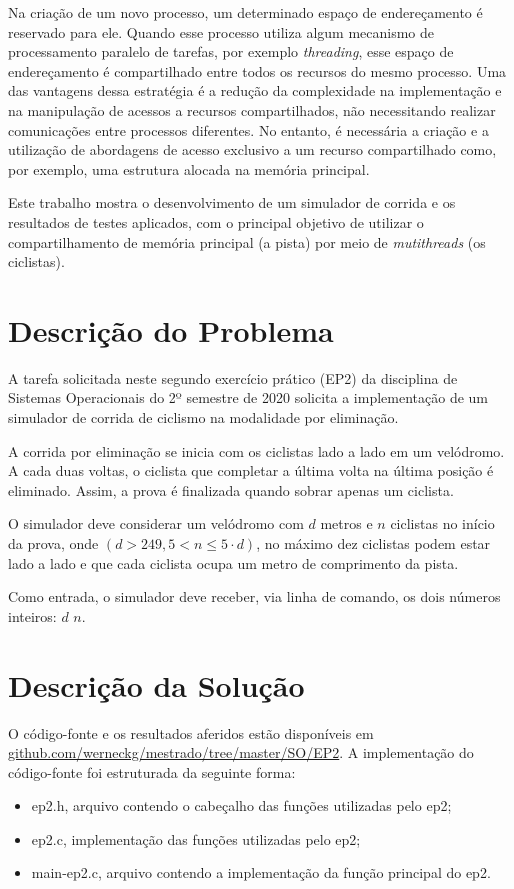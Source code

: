 \documentclass[12pt]{article}
\begin{document}
Na criação de um novo processo, um determinado espaço de endereçamento é reservado para ele. Quando esse processo utiliza algum mecanismo de processamento paralelo de tarefas, por exemplo \textit{threading}, esse espaço de endereçamento é compartilhado entre todos os recursos do mesmo processo. Uma das vantagens dessa estratégia é a redução da complexidade na implementação e na manipulação de acessos a recursos compartilhados, não necessitando realizar comunicações entre processos diferentes. No entanto, é necessária a criação e a utilização de abordagens de acesso exclusivo a um recurso compartilhado como, por exemplo, uma estrutura alocada na memória principal.

Este trabalho mostra o desenvolvimento de um simulador de corrida e os resultados de testes aplicados, com o principal objetivo de utilizar o compartilhamento de memória principal (a pista) por meio de \textit{mutithreads} (os ciclistas).

\section{Descrição do Problema} \label{sec:firstpage}

A tarefa solicitada neste segundo exercício prático (EP2) da disciplina de Sistemas Operacionais do 2º semestre de 2020 solicita a implementação de um simulador de corrida de ciclismo na modalidade por eliminação.

A corrida por eliminação se inicia com os ciclistas lado a lado em um velódromo. A cada duas voltas, o ciclista que completar a última volta na última posição é eliminado. Assim, a prova é finalizada quando sobrar apenas um ciclista.

O simulador deve considerar um velódromo com $d$ metros e $n$ ciclistas no início da prova, onde $(d>249, 5<n\leq 5\cdot d)$, no máximo dez ciclistas podem estar lado a lado e que cada ciclista ocupa um metro de comprimento da pista.

Como entrada, o simulador deve receber, via linha de comando, os dois números inteiros: $d$ $n$.

\section{Descrição da Solução}

O código-fonte e os resultados aferidos estão disponíveis em \url{github.com/werneckg/mestrado/tree/master/SO/EP2}. A implementação do código-fonte foi estruturada da seguinte forma:
\begin{itemize}
	\item ep2.h, arquivo contendo o cabeçalho das funções utilizadas pelo ep2;
	\item ep2.c, implementação das funções utilizadas pelo ep2;
	\item main-ep2.c, arquivo contendo a implementação da função principal do ep2.
\end{itemize}
\end{document}
